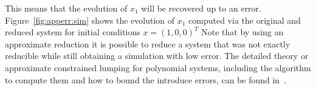 This means that the evolution of $x_1$ will be recovered up to an error.
Figure~\ref{fig:apperr:sim} shows the evolution of $x_1$ computed via the original and reduced system for initial conditions $x = (1,0,0)^{T}$
Note that by using an approximate reduction it is possible to reduce a system that was not exactly reducible while still obtaining a simulation with low error.
The detailed theory or approximate constrained lumping for polynomial systems, including the algorithm to compute them and how to bound the introduce errors, can be found in~\cite{leguizamon-robayo_approximate_2023}.












